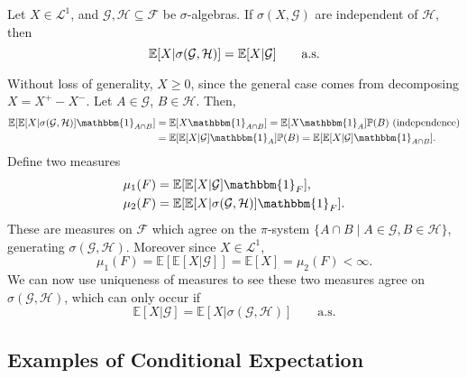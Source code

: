 \documentclass[12pt]{article}
\begin{document}
\begin{proposition}
	Let $X \in \mathcal{L}^1$, and $\mathcal{G}, \mathcal{H} \subseteq \mathcal{F}$ be $\sigma$-algebras. If $\sigma(X, \mathcal{G})$ are independent of $\mathcal{H}$, then
	\[
		\mathbb{E}[X|\sigma(\mathcal{G}, \mathcal{H})] = \mathbb{E}[X|\mathcal{G}] \qquad \text{\normalfont{a.s.}}
	\]
\end{proposition}

\begin{proofbox}
	Without loss of generality, $X \geq 0$, since the general case comes from decomposing $X = X^+ - X^-$. Let $A \in \mathcal{G}$, $B \in \mathcal{H}$. Then,
	\begin{align*}
		\mathbb{E}[\mathbb{E}[X|\sigma(\mathcal{G},\mathcal{H})]\mathbbm{1}_{A \cap B}] &= \mathbb{E}[X \mathbbm{1}_{A \cap B}] = \mathbb{E}[X \mathbbm{1}_{A}]\mathbb{P}(B) \text{ (independence)} \\
												&= \mathbb{E}[\mathbb{E}[X|\mathcal{G}] \mathbbm{1}_{A}] \mathbb{P}(B) = \mathbb{E}[\mathbb{E}[X|\mathcal{G}] \mathbbm{1}_{A \cap B}].
	\end{align*}
	Define two measures
	\begin{align*}
		\mu_1(F) &= \mathbb{E}[\mathbb{E}[X|\mathcal{G}] \mathbbm{1}_{F}], \\
		\mu_2(F) &= \mathbb{E}[\mathbb{E}[X | \sigma(\mathcal{G}, \mathcal{H})] \mathbbm{1}_{F}].
	\end{align*}
	These are measures on $\mathcal{F}$ which agree on the $\pi$-system $\{A \cap B \mid A \in \mathcal{G}, B \in \mathcal{H}\}$, generating $\sigma(\mathcal{G}, \mathcal{H})$. Moreover since $X \in \mathcal{L}^1$,
	\[
	\mu_1(F) = \mathbb{E}[\mathbb{E}[X|\mathcal{G}]] = \mathbb{E}[X] = \mu_2(F) < \infty.
	\]
	We can now use uniqueness of measures to see these two measures agree on $\sigma(\mathcal{G}, \mathcal{H})$, which can only occur if
	\[
		\mathbb{E}[X|\mathcal{G}] = \mathbb{E}[X|\sigma(\mathcal{G}, \mathcal{H})] \qquad \text{a.s.}
	\]
\end{proofbox}

\subsection{Examples of Conditional Expectation}%
\label{sub:exp}
\end{document}

